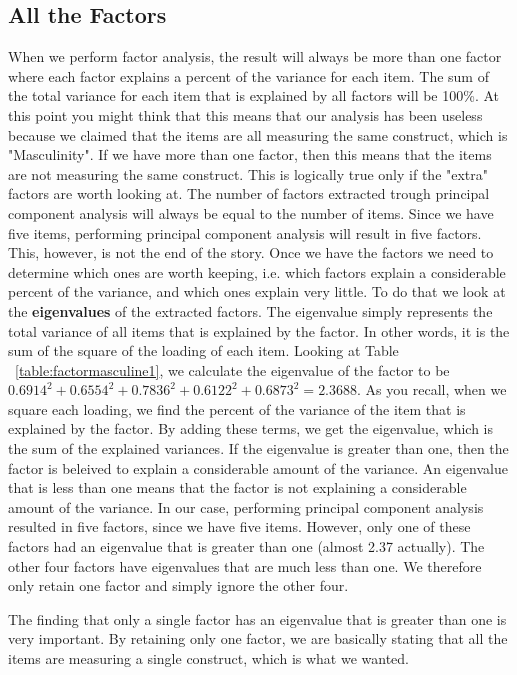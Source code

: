 \documentclass[a4paper,12pt,oneside]{book}
\begin{document}
\subsection{All the Factors}
When we perform factor analysis, the result will always be more than one factor where each factor explains a percent of the variance for each item.
The sum of the total variance for each item that is explained by all factors will be 100\%. At this point you might think that this means that 
our analysis has been useless because we claimed that the items are all measuring the same construct, which is "Masculinity". If we have more than
one factor, then this means that the items are not measuring the same construct. This is logically true only if the "extra" factors are worth looking
at. The number of factors extracted trough principal component analysis will always be equal to the number of items. Since we have five items,
performing principal component analysis will result in five factors. This, however, is not the end of the story. Once we have the factors we need to
determine which ones are worth keeping, i.e. which factors explain a considerable percent of the variance, and which ones explain very little. To do
that we look at the \textbf{eigenvalues} of the extracted factors. The eigenvalue simply represents the total variance of all items that is explained
by the factor. In other words, it is the sum of the square of the loading of each item. Looking at Table ~\ref{table:factormasculine1}, we calculate
the eigenvalue of the factor to be $0.6914^2+0.6554^2+0.7836^2+0.6122^2+0.6873^2=2.3688$. As you recall, when we square each loading, we find the
percent of the variance of the item that is explained by the factor. By adding these terms, we get the eigenvalue, which is the sum of the explained
variances. If the eigenvalue is greater than one, then the factor is beleived to explain a considerable amount of the variance. An eigenvalue
that is less than one means that the factor is not explaining a considerable amount of the variance. In our case, performing principal component
analysis resulted in five factors, since we have five items. However, only one of these factors had an eigenvalue that is greater than one (almost
2.37 actually). The other four factors have eigenvalues that are much less than one. We therefore only retain one factor and simply ignore the other
four. 

The finding that only a single factor has an eigenvalue that is greater than one is very important. By retaining only one factor, we are basically
stating that all the items are measuring a single construct, which is what we wanted.  
\end{document}
